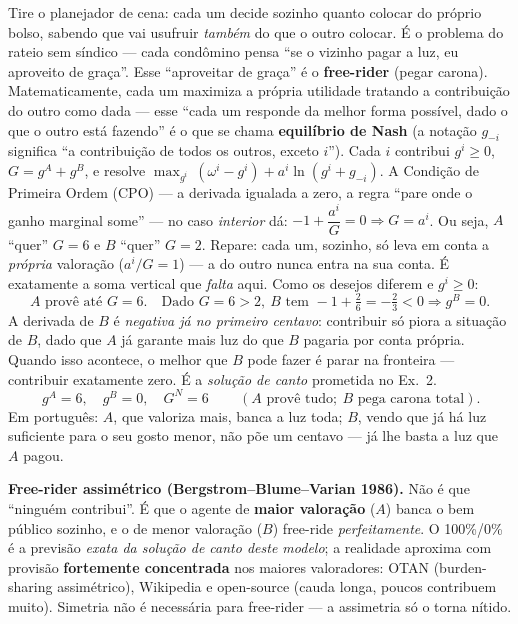 \documentclass[11pt]{article}
\newcommand{\passo}[1]{\par\medskip\noindent{\bfseries\color{insperdark}#1}\par}
\begin{document}
\passo{Passo 3 --- Provisão voluntária Nash (c).}
Tire o planejador de cena: cada um decide sozinho quanto colocar do próprio bolso, sabendo que vai usufruir
\emph{também} do que o outro colocar. É o problema do rateio sem síndico --- cada condômino pensa ``se o vizinho
pagar a luz, eu aproveito de graça''. Esse ``aproveitar de graça'' é o \textbf{free-rider} (pegar carona).
Matematicamente, cada um maximiza a própria utilidade tratando a contribuição do outro como dada --- esse
``cada um responde da melhor forma possível, dado o que o outro está fazendo'' é o que se chama
\textbf{equilíbrio de Nash} (a notação $g_{-i}$ significa ``a contribuição de todos os outros, exceto $i$'').
Cada $i$ contribui $g^i\ge0$, $G=g^A+g^B$, e resolve $\max_{g^i}\ (\omega^i-g^i)+a^i\ln(g^i+g_{-i})$.
A Condição de Primeira Ordem (CPO) --- a derivada igualada a zero, a regra ``pare onde o ganho marginal
some'' --- no caso \emph{interior} dá: $-1+\dfrac{a^i}{G}=0\Rightarrow G=a^i$. Ou seja, $A$ ``quer'' $G=6$ e
$B$ ``quer'' $G=2$.
Repare: cada um, sozinho, só leva em conta a \emph{própria} valoração ($a^i/G=1$) --- a do outro nunca entra na
sua conta. É exatamente a soma vertical que \emph{falta} aqui.
Como os desejos diferem e $g^i\ge0$:
\[
  A\text{ provê até }G=6.\quad\text{Dado }G=6>2,\ B\text{ tem }-1+\tfrac{2}{6}=-\tfrac23<0\Rightarrow g^B=0.
\]
A derivada de $B$ é \emph{negativa já no primeiro centavo}: contribuir só piora a situação de $B$, dado que $A$
já garante mais luz do que $B$ pagaria por conta própria. Quando isso acontece, o melhor que $B$ pode fazer é
parar na fronteira --- contribuir exatamente zero. É a \emph{solução de canto} prometida no Ex.~2.
\[
  \boxed{\,g^A=6,\quad g^B=0,\quad G^N=6\,}\qquad(A\text{ provê tudo};\ B\text{ pega carona total}).
\]
Em português: $A$, que valoriza mais, banca a luz toda; $B$, vendo que já há luz suficiente para o seu gosto
menor, não põe um centavo --- já lhe basta a luz que $A$ pagou.

\begin{intuibox}
\textbf{Free-rider assimétrico (Bergstrom--Blume--Varian 1986).} Não é que ``ninguém contribui''. É que
o agente de \textbf{maior valoração} ($A$) banca o bem público sozinho, e o de menor valoração ($B$)
free-ride \emph{perfeitamente}. O 100\%/0\% é a previsão \emph{exata da solução de canto deste modelo};
a realidade aproxima com provisão \textbf{fortemente concentrada} nos maiores valoradores: OTAN
(burden-sharing assimétrico), Wikipedia e open-source (cauda longa, poucos contribuem muito).
Simetria não é necessária para free-rider --- a assimetria só o torna nítido.
\end{intuibox}
\end{document}
